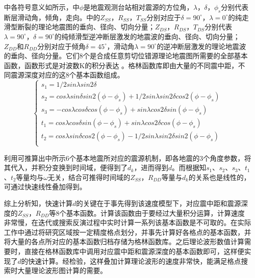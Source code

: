中各符号意义如所示，中$\phi$是地震观测台站相对震源的方位角，$\lambda$，$\delta$，${\phi}_s$分别代表断层滑动角，倾角，走向。中的$Z_{SS}$，$R_{SS}$，$T_{SS}$分别对应于$\delta=90^\circ$，$\lambda=0^\circ$的纯走滑型断裂的理论地震图的垂向、径向、切向分量；$Z_{DS}$，$R_{DS}$，$T_{DS}$分别代表$\lambda=90^\circ$，$\delta=90^\circ$的纯倾滑型逆冲断层激发的地震波的垂向、径向、切向分量；$Z_{DD}$和$R_{DD}$分别对应于倾角$\delta=45^\circ$，滑动角$\lambda=90^\circ$的逆冲断层激发的理论地震波的垂向、径向分量。它们8个是合成任意剪切位错源理论地震图所需要的全部基本函数，函数形式是对波数K的积分表达\citep{Wang1980} 。格林函数库即由大量的不同震中距，不同震源深度对应的这8个基本函数组成。
\begin{equation}
\label{eq2_11}
\left\{
    \begin{array}{l}
    s_1=1/2{sin\lambda}sin{2\delta}\\
    s_2={cos\lambda}{sin\delta}sin2({\phi}-{\phi}_s)+1/2{sin\lambda}{sin2\delta}cos2({\phi}-{\phi}_s)\\
    s_3=-{cos\lambda}{cos\delta}cos({\phi}-{\phi}_s)+{sin\lambda}{cos2\delta}sin({\phi}-{\phi}_s)\\
    t_1={cos\lambda}{cos\delta}sin({\phi}-{\phi}_s)+{sin\lambda}{cos2\delta}cos({\phi}-{\phi}_s)\\
    t_2={cos\lambda}{sin\delta}cos2({\phi}-{\phi}_s)-1/2{sin\lambda}{sin2\delta}sin2({\phi}-{\phi}_s)\\
    \end{array}
\right.
\end{equation}

利用可推算出中所示6个基本地震所对应的震源机制，即各地震的3个角度参数，将其代入，并积分变换到时间域，便得到了$d_k$，进而得到$d$。而根据知$s_1$、$s_2$、$s_3$、$t_1$、$t_2$等量均与$\omega$无关，结合可推得时间域的$Z_{SS}$，$R_{DD}$等量与$d_k$的关系也是线性的，可通过快速线性叠加得到。

综上分析知，快速计算$d$的关键在于事先得到该速度模型下，对应震中距和震源深度的$Z_{SS}$，$R_{DD}$等8个基本函数。计算该函数由于要经过大量积分运算，计算速度非常慢，在迭代或搜索反演过程中实时计算一系列该基本函数是不可取的。在实际工作中通过将研究区域按一定精度格点划分，并事先计算好各格点的基本函数，并将大量的各点所对应的基本函数归档存储为格林函数库。之后理论波形数值计算需要时，直接在格林函数库中调用对应震中距和震源深度的基本函数即可，这样便实现了$d$的快速计算。经检验，这样叠加计算理论波形的速度非常快，能满足格点搜索时大量理论波形图计算的需要。

